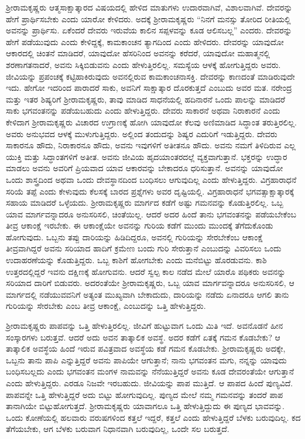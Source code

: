 \vskip 2pt

ಶ‍್ರೀರಾಮಕೃಷ್ಣರು ಆತ್ಮಸಾಕ್ಷಾತ್ಕಾರದ ವಿಷಯದಲ್ಲಿ ಹೇಳಿದ ಮಾತುಗಳು ಉದಾರವಾಗಿವೆ, ವಿಶಾಲವಾಗಿವೆ. ದೇವರನ್ನು ಹೇಗೆ ಪ್ರಾರ್ಥಿಸಬೇಕು ಎಂದು ಯಾರೋ ಕೇಳಿದರು. ಅದಕ್ಕೆ ಶ‍್ರೀರಾಮಕೃಷ್ಣರು “ನಿನಗೆ ಮನಸ್ಸು ತೋರಿದ ರೀತಿಯಲ್ಲಿ ಅವನನ್ನು ಪ್ರಾರ್ಥಿಸು. ಏಕೆಂದರೆ ದೇವರು ಇರುವೆಯ ಕಾಲಿನ ಸಪ್ಪಳವನ್ನು ಕೂಡ ಆಲಿಸಬಲ್ಲ” ಎಂದರು. ದೇವರನ್ನು ಹೇಗೆ ಪಡೆಯುವುದು ಎಂದು ಕೇಳಿದ್ದಕ್ಕೆ, ಕಾಮಕಾಂಚನ ತ್ಯಾಗದಿಂದ ಎಂದು ಹೇಳಿದರು. ದೇವರನ್ನು ಯಾವುದೋ ಆಕಾರದಲ್ಲಿ ಚಿಂತನೆ ಮಾಡಿದರೆ, ಯಾವುದೋ ಹೆಸರಿನಿಂದ ಅವನನ್ನು ಕರೆದರೆ, ಯಾವುದೋ ಮಹಾತ್ಮನಲ್ಲಿ ಶರಣಾಗತನಾದರೆ, ಅವನು ಸಿಕ್ಕಿಬಿಡುವನು ಎಂದು ಹೇಳುತ್ತಿರಲಿಲ್ಲ. ಸಮಸ್ಯೆಯ ಆಳಕ್ಕೆ ಹೋಗುತ್ತಿದ್ದರು ಅವರು. ಜೀವಿಯನ್ನು ಪ್ರಪಂಚಕ್ಕೆ ಕಟ್ಟಿಹಾಕಿರುವುದು ಅವನಲ್ಲಿರುವ ಕಾಮಕಾಂಚನಾಸಕ್ತಿ. ದೇವರನ್ನು ಕಾಣದಂತೆ ಮಾಡಿರುವುದೇ ಇದು. ಹೇಗೋ ಇದರಿಂದ ಪಾರಾದರೆ ಸಾಕು, ಅವನಿಗೆ ಸಾಕ್ಷಾತ್ಕಾರ ದೊರಕುತ್ತದೆ ಎಂಬುದು ಅವರ ಮತ. ನರೇಂದ್ರ ಮತ್ತು ಇತರ ಶಿಷ್ಯರಿಗೆ ಶ‍್ರೀರಾಮಕೃಷ್ಣರು, ತಾವು ಮಾಡಿದ ಸಾಧನೆಯಲ್ಲಿ ಹದಿನಾರನೆ ಒಂದು ಪಾಲನ್ನು ಮಾಡಿದರೆ ಸಾಕು ಭಗವಂತನನ್ನು ಪಡೆಯಬಹುದು ಎಂದು ಹೇಳುತ್ತಿದ್ದರು. ದೇವರು ಸಾಕಾರನೆ ಅಥವಾ ನಿರಾಕಾರನೆ ಎಂದು ಕೇಳಿದಾಗ ಶ‍್ರೀರಾಮಕೃಷ್ಣರು ವಿಚಾರದ ಉಗ್ರಾಣಕ್ಕೆ ಹೋಗಿ ಯಾವುದೋ ಕೆಲವು ಅಣಿಮಾಡಿದ ಸಿದ್ಧಾಂತ ತರುತ್ತಿರಲಿಲ್ಲ. ಅವರು ಅನುಭವದ ಆಳಕ್ಕೆ ಮುಳುಗುತ್ತಿದ್ದರು. ಅಲ್ಲಿಂದ ತಂದುದನ್ನು ಶಿಷ್ಯರ ಎದುರಿಗೆ ಇಡುತ್ತಿದ್ದರು. ದೇವರು ಸಾಕಾರನೂ ಹೌದು, ನಿರಾಕಾರನೂ ಹೌದು, ಅವನು ಇವುಗಳಿಗೆ ಅತೀತನೂ ಹೌದು. ಅವನು ನಮಗೆ ತಿಳಿದಿರುವ ಎಲ್ಲ ಯುಕ್ತಿ ಮತ್ತು ಸಿದ್ಧಾಂತಗಳಿಗೆ ಅತೀತ. ಅವನು ಜೀವಿಯ ಹೃದಯಾಂತರದಲ್ಲೆ ವ್ಯಕ್ತವಾಗುತ್ತಾನೆ. ಭಕ್ತರನ್ನು ಉದ್ಧಾರ ಮಾಡಲು ಅವನು ಅವರಿಗೆ ಪ್ರಿಯವಾದ ಯಾವ ಆಕಾರವನ್ನು ಬೇಕಾದರೂ ಧರಿಸುತ್ತಾನೆ. ಅವನನ್ನು ಯಾವುದೋ ಒಂದು ಶಾಸ್ತ್ರದಿಂದ ಅಥವಾ ಒಂದು ದೇವಸ್ಥಾನದಿಂದ ಬಂಧಿಸಲು ಆಗುವುದಿಲ್ಲ ಎಂದು ಹೇಳುತ್ತಿದ್ದರು. ವಿಗ್ರಹಾರಾಧನೆ ಸರಿಯೆ ತಪ್ಪೆ ಎಂದು ಕೇಳುವುದು ಕೆಲಸಕ್ಕೆ ಬಾರದ ಪ್ರಶ್ನೆಗಳು ಅವರ ದೃಷ್ಟಿಯಲ್ಲಿ. ವಿಗ್ರಹಾರಾಧನೆ ಭಗವತ್ಸಾಕ್ಷಾತ್ಕಾರಕ್ಕೆ ಸಹಾಯ ಮಾಡಿದರೆ ಒಳ್ಳೆಯದು. ಶ‍್ರೀರಾಮಕೃಷ್ಣರು ಮಾರ್ಗದ ಕಡೆಗೆ ಅಷ್ಟು ಗಮನವನ್ನು ಕೊಡುತ್ತಿರಲಿಲ್ಲ. ಒಬ್ಬ ಯಾವ ಮಾರ್ಗವನ್ನಾದರೂ ಅನುಸರಿಸಲಿ, ಚಿಂತೆಯಿಲ್ಲ. ಆದರೆ ಅದರ ಹಿಂದೆ ತಾನು ಭಗವಂತನನ್ನು ಪಡೆಯಬೇಕೆಂಬ ತೀವ್ರ ಆಕಾಂಕ್ಷೆ ಇರಬೇಕು. ಈ ಆಕಾಂಕ್ಷೆಯೇ ಅವನನ್ನು ಗುರಿಯ ಕಡೆಗೆ ಮುಂದು ಮುಂದಕ್ಕೆ ತೆಗೆದುಕೊಂಡು ಹೋಗುವುದು. ಒಬ್ಬನು ತಪ್ಪು ದಾರಿಯನ್ನು ಹಿಡಿದಿದ್ದರೂ, ಅವನಲ್ಲಿ ಗುರಿಯನ್ನು ಸೇರಬೇಕೆಂಬ ಆಕಾಂಕ್ಷೆ ತೀವ್ರವಾಗಿದ್ದರೆ ಅವನು ಸರಿಯಾದ ಹಾದಿಗೆ ಕ್ರಮೇಣ ಬಂದು ಗುರಿ ಸೇರುತ್ತಾನೆ ಎಂಬುದನ್ನು ವಿವರಿಸಲು ಒಂದು ಉದಾಹರಣೆಯನ್ನು ಕೊಡುತ್ತಿದ್ದರು. ಒಬ್ಬ ಕಾಶಿಗೆ ಹೋಗಬೇಕು ಎಂದು ಮನೆಬಿಟ್ಟು ಹೊರಡುವನು. ಕಾಶಿ ಉತ್ತರದಲ್ಲಿದ್ದರೆ ಇವನು ದಕ್ಷಿಣಕ್ಕೆ ಹೋಗುವನು. ಆದರೆ ಸ್ವಲ್ಪ ಕಾಲ ನಡೆದ ಮೇಲೆ ಯಾರೊ ಪಥಿಕರು ಅವನನ್ನು ಸರಿಯಾದ ದಾರಿಗೆ ಬಿಡುವರು. ಅದರಂತೆಯೇ ಶ‍್ರೀರಾಮಕೃಷ್ಣರು, ಒಬ್ಬ ಯಾವ ಮಾರ್ಗವನ್ನಾದರೂ ಅನುಸರಿಸಲಿ, ಆ ಮಾರ್ಗದಲ್ಲಿ ನಡೆಯುವವನಿಗೆ ಅತ್ಯಂತ ಮುಖ್ಯವಾಗಿ ಬೇಕಾದುದು, ದಾರಿಯನ್ನು ನಡೆದು ಏನಾದರೂ ಆಗಲಿ ತಾನು ಗುರಿಯನ್ನು ಸೇರಬೇಕು ಎಂಬ ತೀವ್ರ ಆಕಾಂಕ್ಷೆ, ಎಂಬುದನ್ನು ಒತ್ತಿ ಹೇಳುತ್ತಿದ್ದರು.

ಶ‍್ರೀರಾಮಕೃಷ್ಣರು ಪಾಪವನ್ನು ಒತ್ತಿ ಹೇಳುತ್ತಿರಲಿಲ್ಲ. ಜೀವಿಗೆ ಹುಟ್ಟುವಾಗ ಒಂದು ಮಿತಿ ಇದೆ. ಅವನೊಡನೆ ಹೀನ ಸಂಸ್ಕಾರಗಳು ಬರುತ್ತವೆ. ಆದರೆ ಅದು ಅವನ ತಾತ್ಕಾಲಿಕ ಅವಸ್ಥೆ. ಅದರ ಕಡೆಗೆ ಏತಕ್ಕೆ ಗಮನ ಕೊಡಬೇಕು? ಆ ತಾತ್ಕಾಲಿಕ ಅವಸ್ಥೆಯ ಹಿಂದೆ ಇರುವ ಪವಿತ್ರವಾದ ಅವಸ್ಥೆಯ ಕಡೆ ಗಮನ ಕೊಡಬೇಕು. ಶ‍್ರೀರಾಮಕೃಷ್ಣರು ಅದಕ್ಕೇ, ಒಬ್ಬನು ತಾನು ಪಾಪಿ ಎನ್ನುತ್ತಿದ್ದರೆ ಅವನು ಪಾಪಿಯೇ ಆಗುತ್ತಾನೆ; ನಾನು ಭಗವಂತನ ಮಗು, ನನ್ನನ್ನು ಯಾವುದು ಬಂಧಿಸಬಲ್ಲದು ಎಂದು ಭಗವಂತನ ಮಂಗಳ ನಾಮವನ್ನು ನೆನೆಯುತ್ತಿದ್ದರೆ ಅವನು ಕೂಡ ದೇವರಂತೆಯೇ ಆಗುತ್ತಾನೆ ಎಂದು ಹೇಳುತ್ತಿದ್ದರು. ಎರಡೂ ನಿಜವೇ ಇರಬಹುದು. ಜೀವಿಯನ್ನು ಪಾಪ ಮುತ್ತಿದೆ. ಆ ಪಾಪದ ಹಿಂದೆ ಪುಣ್ಯವಿದೆ. ಪಾಪವನ್ನೇ ಒತ್ತಿ ಹೇಳುತ್ತಿದ್ದರೆ ಅದು ಬಿಟ್ಟು ಹೋಗುವುದಿಲ್ಲ. ಪುಣ್ಯದ ಮೇಲೆ ನಮ್ಮ ಗಮನವನ್ನು ತಂದರೆ ಪಾಪ ತಾನಾಗಿಯೇ ಬಿಟ್ಟುಹೋಗುತ್ತದೆ. ಶ‍್ರೀರಾಮಕೃಷ್ಣರು ಯಾವಾಗಲೂ ಒತ್ತಿ ಹೇಳುತ್ತಿದ್ದುದು ಈ ಪುಣ್ಯದ ಭಾವವನ್ನು. ಒಂದು ಕೋಣೆಯಲ್ಲಿ ಹಲವಾರು ವರುಷಗಳಿಂದ ಕತ್ತಲೆ ಇದ್ದರೆ, ಕತ್ತಲೆ ಎಂದು ಹೇಳುತ್ತಿದ್ದರೆ ಬೆಳಕು ಬರುವುದಿಲ್ಲ. ಕದ ತೆಗೆಯಬೇಕು, ಆಗ ಬೆಳಕು ಬರುವಾಗ ನಿಧಾನವಾಗಿ ಬರುವುದಿಲ್ಲ, ಒಂದೇ ಸಲ ಬರುತ್ತದೆ.

